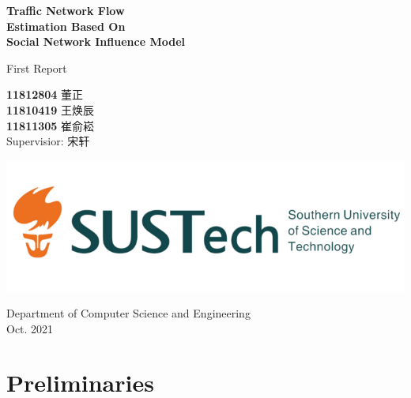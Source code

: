 \documentclass[fontset=none]{ctexart}
\theoremstyle{definition}
\theoremstyle{remark}
\begin{document}
\begin{titlepage}
    \begin{center}
        \vspace*{1cm}
            
        \Huge
        \textbf{Traffic Network Flow\\ Estimation Based On\\ Social Network Influence Model}
            
        \vspace{0.5cm}
        \LARGE
        First Report\\
            
        \vspace{1.5cm}
            
        \textbf{11812804}  董\quad 正\\
        \textbf{11810419}  王焕辰\\
        \textbf{11811305}  崔俞崧\\

        \vspace{0.5cm}
        Supervisior: 宋轩
            
        \vfill
            
        \includegraphics[width=\textwidth]{images/sustc.png}
            
        \vspace{0.2cm}
            
        \Large
        Department of Computer Science and Engineering\\
        \vspace{0.5cm}
        Oct. 2021
            
    \end{center}
\end{titlepage}

\tableofcontents

\clearpage
\section{Preliminaries}
\end{document}
